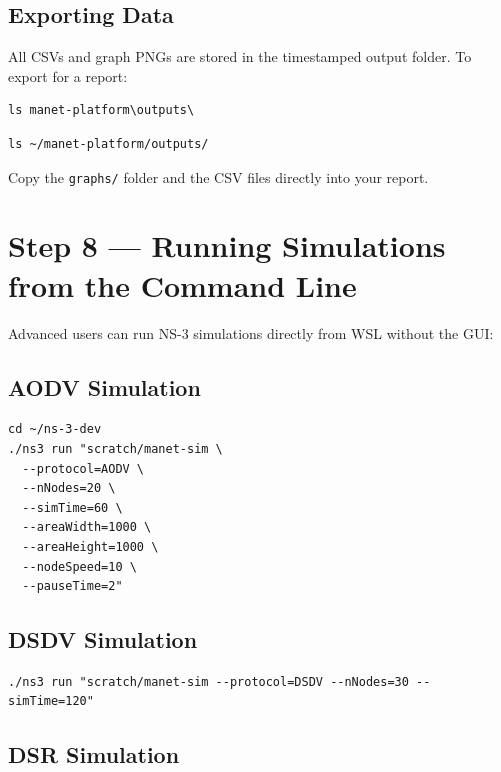 \documentclass[12pt,a4paper]{article}
\newcommand{\file}[1]{\texttt{\color{codered}#1}}
\begin{document}
\subsection{Exporting Data}

All CSVs and graph PNGs are stored in the timestamped output folder. To export for a report:

\begin{lstlisting}[style=bash, caption={Find your output folder (PowerShell)}]
ls manet-platform\outputs\
\end{lstlisting}

\begin{lstlisting}[style=bash, caption={Find your output folder (WSL)}]
ls ~/manet-platform/outputs/
\end{lstlisting}

Copy the \file{graphs/} folder and the CSV files directly into your report.


\section{Step 8 — Running Simulations from the Command Line}

Advanced users can run NS-3 simulations directly from WSL without the GUI:

\subsection{AODV Simulation}

\begin{lstlisting}[style=bash, caption={Run AODV simulation directly}]
cd ~/ns-3-dev
./ns3 run "scratch/manet-sim \
  --protocol=AODV \
  --nNodes=20 \
  --simTime=60 \
  --areaWidth=1000 \
  --areaHeight=1000 \
  --nodeSpeed=10 \
  --pauseTime=2"
\end{lstlisting}

\subsection{DSDV Simulation}

\begin{lstlisting}[style=bash, caption={Run DSDV simulation}]
./ns3 run "scratch/manet-sim --protocol=DSDV --nNodes=30 --simTime=120"
\end{lstlisting}

\subsection{DSR Simulation}
\end{document}

